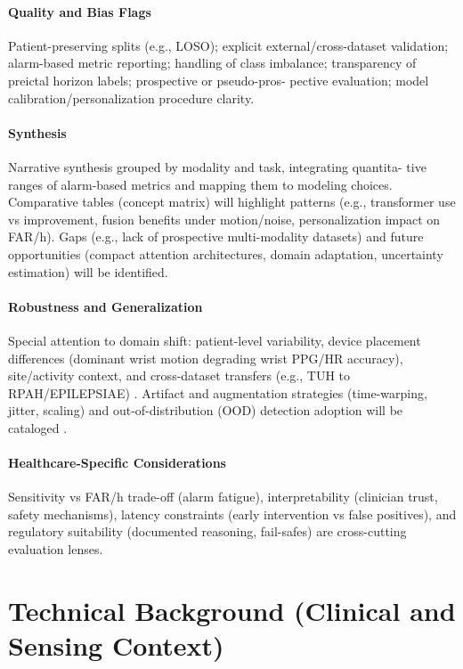 \paragraph{Quality and Bias Flags}
Patient-preserving splits (e.g., LOSO); explicit external/cross-dataset
validation; alarm-based metric reporting; handling of class imbalance;
transparency of preictal horizon labels; prospective or pseudo-pros-
pective evaluation; model calibration/personalization procedure clarity.

\paragraph{Synthesis}
Narrative synthesis grouped by modality and task, integrating quantita-
tive ranges of alarm-based metrics and mapping them to modeling choices.
Comparative tables (concept matrix) will highlight patterns (e.g.,
transformer use vs improvement, fusion benefits under motion/noise,
personalization impact on FAR/h). Gaps (e.g., lack of prospective
multi-modality datasets) and future opportunities (compact attention
architectures, domain adaptation, uncertainty estimation) will be
identified.

\paragraph{Robustness and Generalization}
Special attention to domain shift: patient-level variability, device
placement differences (dominant wrist motion degrading wrist PPG/HR
accuracy), site/activity context, and cross-dataset transfers (e.g.,
TUH to RPAH/EPILEPSIAE) \parencite{yangMultimodalAISystem2022,andradePerformanceSeizurePrediction2024}.
Artifact and augmentation strategies (time-warping, jitter, scaling)
and out-of-distribution (OOD) detection adoption will be cataloged
\parencite{kalousiosECGbasedEpilepticSeizure2024,sethFeasibilityCardiacbasedSeizure2023}.

\paragraph{Healthcare-Specific Considerations}
Sensitivity vs FAR/h trade-off (alarm fatigue), interpretability
(clinician trust, safety mechanisms), latency constraints (early
intervention vs false positives), and regulatory suitability
(documented reasoning, fail-safes) are cross-cutting evaluation lenses.

\section{Technical Background (Clinical and Sensing Context)}
